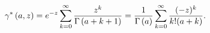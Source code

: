 \[\gamma^{*}\left(a,z\right)=e^{-z}\sum_{k=0}^{\infty}\frac{z^{k}}{\Gamma\left(a%
+k+1\right)}=\frac{1}{\Gamma\left(a\right)}\sum_{k=0}^{\infty}\frac{(-z)^{k}}{%
k!(a+k)}.\]